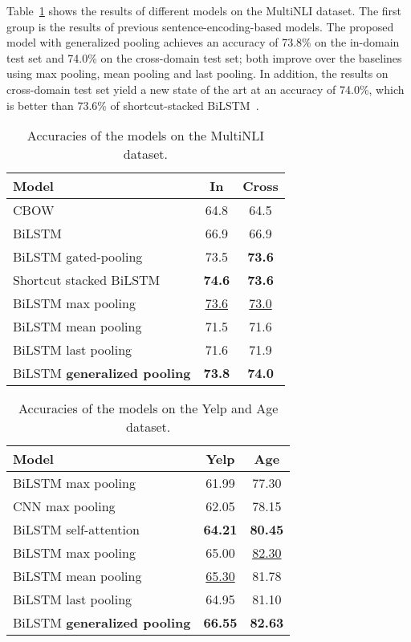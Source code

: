 \documentclass[11pt]{article}
\begin{document}
Table~\ref{tab:multinli} shows the results of different models on the MultiNLI dataset. The first group is the results of previous sentence-encoding-based models. The proposed model with generalized pooling achieves an accuracy of 73.8\% on the in-domain test set and 74.0\% on the cross-domain test set; both improve over the baselines using max pooling, mean pooling and last pooling. In addition, the results on cross-domain test set yield a new state of the art at an accuracy of 74.0\%, which is better than 73.6\% of shortcut-stacked BiLSTM~\cite{DBLP:conf/repeval/NieB17}.

\begin{table}[t!]
\centering
\begin{tabular}{|l|c|c|}
\hline
\textbf{Model}     & \textbf{In} & \textbf{Cross}   \\
\hline
CBOW~\cite{DBLP:journals/corr/WilliamsNB17} & 64.8 & 64.5 \\
BiLSTM~\cite{DBLP:journals/corr/WilliamsNB17} &  66.9 & 66.9\\
BiLSTM gated-pooling~\cite{DBLP:conf/repeval/ChenZLWJI17} & 73.5 & \textbf{73.6} \\
Shortcut stacked BiLSTM~\cite{DBLP:conf/repeval/NieB17} & \textbf{74.6} & \textbf{73.6} \\
\hline
BiLSTM max pooling & \underline{73.6} & \underline{73.0}\\
BiLSTM mean pooling & 71.5 & 71.6 \\
BiLSTM last pooling & 71.6 & 71.9\\
BiLSTM \textbf{generalized pooling} & \textbf{73.8} &\textbf{74.0} \\
\hline
\end{tabular}
\caption{Accuracies of the models on the MultiNLI dataset.}
\label{tab:multinli}
\end{table}
\begin{table}[t!]
\centering
\begin{tabular}{|l|c|c|}
\hline
\textbf{Model}     & \textbf{Yelp} & \textbf{Age} \\
\hline
BiLSTM max pooling~\cite{DBLP:journals/corr/LinFSYXZB17} & 61.99 & 77.30 \\
CNN max pooling~\cite{DBLP:journals/corr/LinFSYXZB17} & 62.05 & 78.15 \\
BiLSTM self-attention~\cite{DBLP:journals/corr/LinFSYXZB17} & \textbf{64.21} & \textbf{80.45} \\
\hline
BiLSTM max pooling & 65.00 & \underline{82.30}\\
BiLSTM mean pooling & \underline{65.30}  & 81.78 \\
BiLSTM last pooling & 64.95 & 81.10\\
BiLSTM \textbf{generalized pooling} & \textbf{66.55}  & \textbf{82.63}\\
\hline
\end{tabular}
\caption{Accuracies of the models on the Yelp and Age dataset. }
\label{tab:yelp_age}
\end{table}
\end{document}
